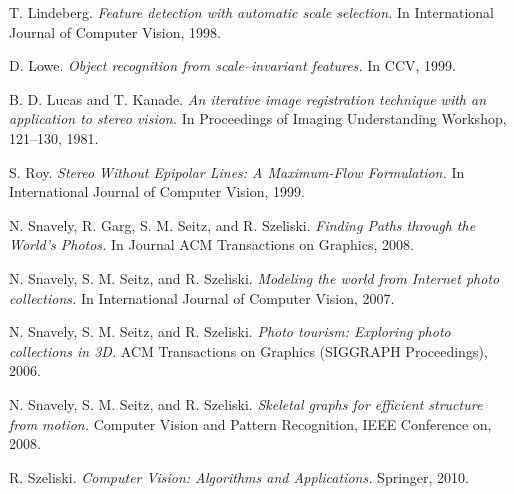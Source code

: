\begin{thebibliography}{99}
  
  {\sc T. Lindeberg.} 
  \emph{Feature detection with automatic scale selection.}
  In International Journal of Computer Vision, 1998.

  {\sc D. Lowe.} 
  \emph{Object recognition from scale–invariant features.}
  In CCV, 1999.

  {\sc B. D. Lucas and T. Kanade. } 
  \emph{An iterative image registration technique with an application to stereo vision.}
  In Proceedings of Imaging Understanding Workshop, 121--130, 1981.

  {\sc S. Roy.} 
  \emph{Stereo Without Epipolar Lines: A Maximum-Flow Formulation.}
  In International Journal of Computer Vision, 1999.

  {\sc N. Snavely, R. Garg, S. M. Seitz, and R. Szeliski.} 
  \emph{Finding Paths through the World's Photos.}
  In Journal ACM Transactions on Graphics, 2008.

  {\sc N. Snavely, S. M. Seitz, and R. Szeliski.} 
  \emph{Modeling the world from Internet photo collections.}
  In International Journal of Computer Vision, 2007.

  {\sc N. Snavely, S. M. Seitz, and R. Szeliski.} 
  \emph{Photo tourism: Exploring photo collections in 3D.}
  ACM Transactions on Graphics (SIGGRAPH Proceedings), 2006.

  {\sc N. Snavely, S. M. Seitz, and R. Szeliski.} 
  \emph{Skeletal graphs for efficient structure from motion.}
  Computer Vision and Pattern Recognition, IEEE Conference on, 2008.

  {\sc R. Szeliski.}
  \emph{Computer Vision: Algorithms and Applications.}
  Springer, 2010. 


\end{thebibliography}
